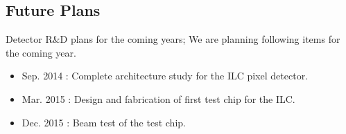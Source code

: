 \subsection{Future Plans}
Detector R\&D plans for the coming years;
We are planning following items for the coming year.
\begin{itemize}
\item Sep. 2014 : Complete architecture study for the ILC pixel detector.
\item Mar. 2015 : Design and fabrication of first test chip for the ILC.
\item Dec. 2015 : Beam test of the test chip.
\end{itemize}
